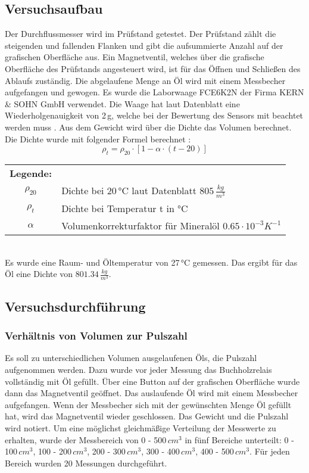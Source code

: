 \subsection{Versuchsaufbau}
Der Durchflussmesser wird im Prüfstand getestet. Der Prüfstand zählt die steigenden und fallenden Flanken und gibt die aufsummierte Anzahl auf der grafischen Oberfläche aus. Ein Magnetventil, welches über die grafische Oberfläche des Prüfstands angesteuert wird, ist für das Öffnen und Schließen des Ablaufs zuständig. Die abgelaufene Menge an Öl wird mit einem Messbecher aufgefangen und gewogen. Es wurde die Laborwaage FCE6K2N der Firma KERN \& SOHN GmbH verwendet. Die Waage hat laut Datenblatt eine Wiederholgenauigkeit von 2\,g, welche bei der Bewertung des Sensors mit beachtet werden muss \cite{fce6k2n_datasheet}. Aus dem Gewicht wird über die Dichte das Volumen berechnet.
Die Dichte wurde mit folgender Formel berechnet \cite{Watter2017}:
\begin{equation}
	\rho_t = \rho_{20} \cdot [1 - \alpha \cdot (t - 20)]
\end{equation}
\vspace{12pt}
\begin{tabular}{c l}
	\textbf{Legende:}\\
	\(\rho_{20}\) & Dichte bei 20\,°C laut Datenblatt \(805\,\frac{kg}{m^3}\) \cite{shell_datasheet}\\
	\(\rho_{t}\) & Dichte bei Temperatur t in °C\\
	\(\alpha\) & Volumenkorrekturfaktor für Mineralöl \(0.65 \cdot 10^{-3}K^{-1}\)\\
\end{tabular}
\vspace{24pt}
\\
\noindent
Es wurde eine Raum- und Öltemperatur von 27\,°C gemessen. Das ergibt für das Öl eine Dichte von \(801.34\,\frac{kg}{m^3}\).

\subsection{Versuchsdurchführung}

\subsubsection{Verhältnis von Volumen zur Pulszahl}
Es soll zu unterschiedlichen Volumen ausgelaufenen Öls, die Pulszahl aufgenommen werden. Dazu wurde vor jeder Messung das Buchholzrelais vollständig mit Öl gefüllt. Über eine Button auf der grafischen Oberfläche wurde dann das Magnetventil geöffnet. Das auslaufende Öl wird mit einem Messbecher aufgefangen. Wenn der Messbecher sich mit der gewünschten Menge Öl gefüllt hat, wird das Magnetventil wieder geschlossen. Das Gewicht und die Pulszahl wird notiert. Um eine möglichst gleichmäßige Verteilung der Messwerte zu erhalten, wurde der Messbereich von 0 - 500\,\(cm^3\) in fünf Bereiche unterteilt: 0 - 100\,\(cm^3\), 100 - 200\,\(cm^3\), 200 - 300\,\(cm^3\), 300 - 400\,\(cm^3\), 400 - 500\,\(cm^3\). Für jeden Bereich wurden 20 Messungen durchgeführt.

